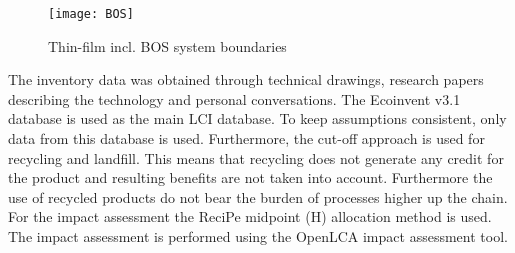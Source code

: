 \begin{figure}[H]
\begin{center}
\texttt{[image: BOS]}
\caption{Thin-film incl. BOS system boundaries}
\label{fig:BOS}
\end{center}
\end{figure}

The inventory data was obtained through technical drawings, research papers describing the technology and personal conversations. The Ecoinvent v3.1 database is used as the main LCI database. To keep assumptions consistent, only data from this database is used. Furthermore, the cut-off approach is used for recycling and landfill. This means that recycling does not generate any credit for the product and resulting benefits are not taken into account. Furthermore the use of recycled products do not bear the burden of processes higher up the chain.\\

For the impact assessment the ReciPe midpoint (H) allocation method is used. The impact assessment is performed using the OpenLCA impact assessment tool.


